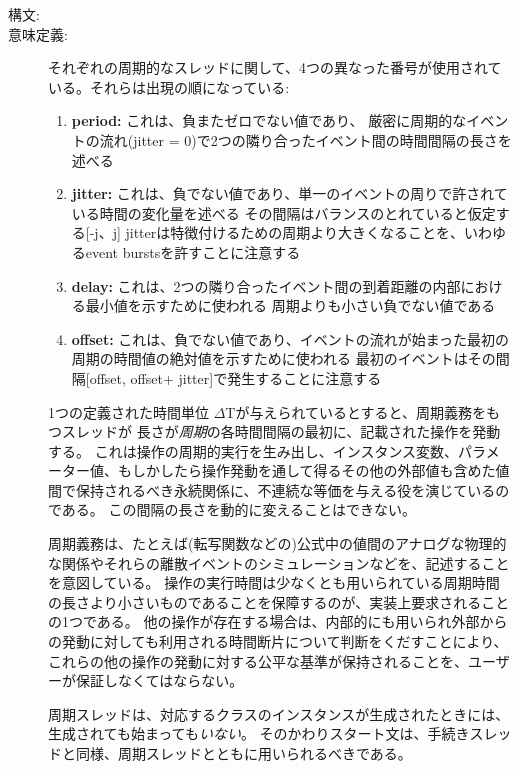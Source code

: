 \documentclass[\pformat,12pt]{jarticle}
\begin{document}
\begin{description}
\item[構文:] 

\item[意味定義:] 
それぞれの周期的なスレッドに関して、4つの異なった番号が使用されている。それらは出現の順になっている: 

\begin{enumerate}
\item \textbf{period:} これは、負またゼロでない値であり、
厳密に周期的なイベントの流れ(jitter = 0)で2つの隣り合ったイベント間の時間間隔の長さを述べる
\item \textbf{jitter:} これは、負でない値であり、単一のイベントの周りで許されている時間の変化量を述べる
その間隔はバランスのとれていると仮定する[-j、j]
jitterは特徴付けるための周期より大きくなることを、いわゆるevent burstsを許すことに注意する
\item \textbf{delay:} これは、2つの隣り合ったイベント間の到着距離の内部における最小値を示すために使われる
周期よりも小さい負でない値である
\item \textbf{offset:} これは、負でない値であり、イベントの流れが始まった最初の周期の時間値の絶対値を示すために使われる
最初のイベントはその間隔[offset, offset+ jitter]で発生することに注意する
\end{enumerate}

1つの定義された時間単位 $\Delta$Tが与えられているとすると、周期義務をもつスレッドが 長さが{\em 周期}の各時間間隔の最初に、記載された操作を発動する。
これは操作の周期的実行を生み出し、インスタンス変数、パラメーター値、もしかしたら操作発動を通して得るその他の外部値も含めた値間で保持されるべき永続関係に、不連続な等価を与える役を演じているのである。 
この間隔の長さを動的に変えることはできない。

周期義務は、たとえば(転写関数などの)公式中の値間のアナログな物理的な関係やそれらの離散イベントのシミュレーションなどを、記述することを意図している。
操作の実行時間は少なくとも用いられている周期時間の長さより小さいものであることを保障するのが、実装上要求されることの1つである。
他の操作が存在する場合は、内部的にも用いられ外部からの発動に対しても利用される時間断片について判断をくだすことにより、これらの他の操作の発動に対する公平な基準が保持されることを、ユーザーが保証しなくてはならない。

周期スレッドは、対応するクラスのインスタンスが生成されたときには、  生成されても始まっても\textit{いない}。
そのかわりスタート文は、手続きスレッドと同様、周期スレッドとともに用いられるべきである。


\end{description}
\end{document}
